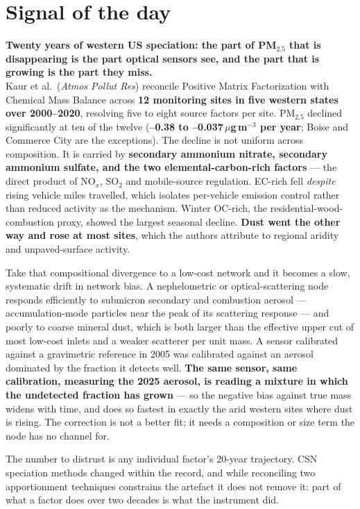 \documentclass[10pt]{article}
\begin{document}
\vspace{6mm}

\section*{\sffamily\bfseries\color{Deep}Signal of the day}
\vspace{-1.5mm}{\color{Amber}\rule{\linewidth}{1.1pt}}\vspace{2.5mm}

\begin{keybox}
{\sffamily\bfseries\small\color{Deep}Twenty years of western US speciation: the part of
PM$_{2.5}$ that is disappearing is the part optical sensors see, and the part that is
growing is the part they miss.}\\[1.4mm]
\footnotesize
Kaur et al.\ (\textit{Atmos Pollut Res}) reconcile Positive Matrix Factorization with
Chemical Mass Balance across \textbf{12 monitoring sites in five western states over
2000--2020}, resolving five to eight source factors per site. PM$_{2.5}$ declined
significantly at ten of the twelve (\textbf{--0.38 to --0.037\,$\mu$g\,m$^{-3}$ per
year}; Boise and Commerce City are the exceptions). The decline is not uniform across
composition. It is carried by \textbf{secondary ammonium nitrate, secondary ammonium
sulfate, and the two elemental-carbon-rich factors} --- the direct product of NO$_x$,
SO$_2$ and mobile-source regulation. EC-rich fell \textit{despite} rising vehicle miles
travelled, which isolates per-vehicle emission control rather than reduced activity as
the mechanism. Winter OC-rich, the residential-wood-combustion proxy, showed the largest
seasonal decline. \textbf{Dust went the other way and rose at most sites}, which the
authors attribute to regional aridity and unpaved-surface activity.

Take that compositional divergence to a low-cost network and it becomes a slow,
systematic drift in network bias. A nephelometric or optical-scattering node responds
efficiently to submicron secondary and combustion aerosol --- accumulation-mode particles
near the peak of its scattering response --- and poorly to coarse mineral dust, which is
both larger than the effective upper cut of most low-cost inlets and a weaker scatterer
per unit mass. A sensor calibrated against a gravimetric reference in 2005 was calibrated
against an aerosol dominated by the fraction it detects well. \textbf{The same sensor,
same calibration, measuring the 2025 aerosol, is reading a mixture in which the
undetected fraction has grown} --- so the negative bias against true mass widens with
time, and does so fastest in exactly the arid western sites where dust is rising. The
correction is not a better fit; it needs a composition or size term the node has no
channel for.

The number to distrust is any individual factor's 20-year trajectory. CSN speciation
methods changed within the record, and while reconciling two apportionment techniques
constrains the artefact it does not remove it: part of what a factor does over two
decades is what the instrument did.
\end{keybox}
\end{document}
